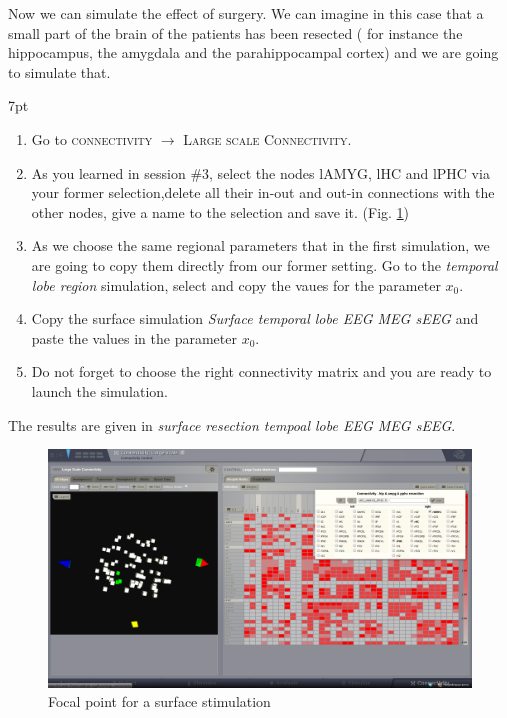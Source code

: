 \documentclass{tufte-handout}
\newenvironment{simulation}{%
  \def\FrameCommand{%
    \hspace{1pt}%
    {\color{ForestGreen}\vrule width 2pt}%
    {\color{simulationshade}\vrule width 4pt}%
    \colorbox{simulationshade}%
  }%
  \MakeFramed{\advance\hsize-\width\FrameRestore}%
  \noindent\hspace{-4.55pt}%
  \begin{adjustwidth}{}{7pt}%
  \vspace{2pt}\vspace{2pt}%
}
{%
  \vspace{2pt}\end{adjustwidth}\endMakeFramed%
}
\begin{document}
Now we can simulate the effect of surgery. We can imagine in this case that a small part of the brain of the patients 
has been resected ( for instance the hippocampus, the amygdala and the parahippocampal cortex) and 
we are going to simulate that.

\begin{simulation}
  \begin{enumerate}
  \item Go to \textsc{connectivity} $\rightarrow$ \textsc{Large scale Connectivity}.
  \item As you learned in session \#3, select the nodes lAMYG, lHC and lPHC via your former selection,delete all their in-out and out-in connections
  with the other nodes, give a name to the selection and save it. (Fig. \ref{fig:resec})
  \item As we choose the same regional parameters that in the first simulation, we are going to copy them directly from our
  former setting. Go to the \textit{temporal lobe region} simulation, select and copy the vaues for the parameter  $x_0$. 
  \item Copy the surface simulation \textit{Surface temporal lobe EEG MEG sEEG} and paste the values in the parameter $x_0$.
  \item Do not forget to choose the right connectivity matrix and you are ready to launch the simulation.
  \end{enumerate}
\end{simulation}

The results are given in \textit{surface resection tempoal lobe EEG MEG sEEG}.

\begin{figure}[h]
  \includegraphics[width=\linewidth]{Handout_UI_ModellingAnEpilepticPatient_ConnectivityMatrixResection}%
  \caption{Focal point for a surface stimulation}%
  \label{fig:resec}%
\end{figure}
\end{document}
